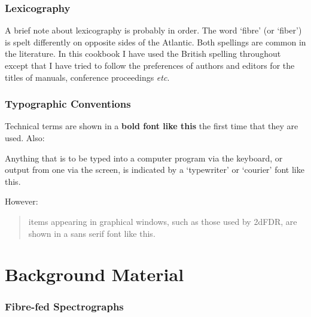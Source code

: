 \documentclass[chapters,twoside,11pt]{starlink}
\begin{document}
\section{\label{LEX}Lexicography}

A brief note about lexicography is probably in order.  The word `fibre'
(or `fiber') is spelt differently on opposite sides of the Atlantic.
Both spellings are common in the literature.  In this cookbook I have
used the British spelling throughout except that I have tried
to follow the preferences of authors and editors for the titles of
manuals, conference proceedings \emph{etc}.


\section{\label{TYPO}Typographic Conventions}

Technical terms are shown in a \textbf{bold font like this} the first
time that they are used.  Also:

\begin{terminalv}
Anything that is to be typed into a computer program via the keyboard,
or output from one via the screen, is indicated by a `typewriter' or
`courier' font like this.
\end{terminalv}

However:

\begin{quote}
\textsf{items appearing in graphical windows, such as those used by 2dFDR,
are shown in a sans serif font like this.}
\end{quote}


\cleardoublepage

\part{Background Material}

\section{\label{SPECTR}Fibre-fed Spectrographs}
\end{document}
